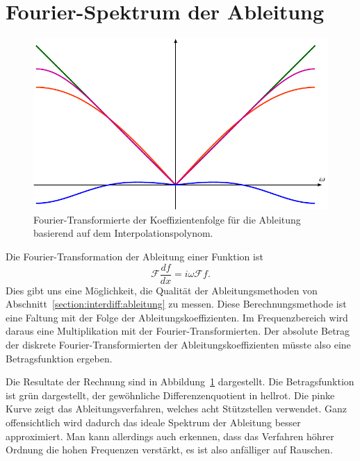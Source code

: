 %
%
%
\section{Fourier-Spektrum der Ableitung}
\begin{figure}
\centering
\includegraphics{papers/interdiff/experiment.pdf}
\caption{Fourier-Transformierte der Koeffizientenfolge für die Ableitung 
basierend auf dem Interpolationspolynom.
\label{interdiff:spektrum}}
\end{figure}
Die Fourier-Transformation der Ableitung einer Funktion ist
\[
\mathcal{F}
\frac{df}{dx}
=
i\omega\mathcal{F}f.
\]
Dies gibt uns eine Möglichkeit, die Qualität der Ableitungsmethoden
von Abschnitt~\ref{section:interdiff:ableitung} zu messen.
Diese Berechnungsmethode ist eine Faltung mit der Folge der
Ableitungskoeffizienten.
Im Frequenzbereich wird daraus eine Multiplikation mit der
Fourier-Transformierten.
Der absolute Betrag der diskrete Fourier-Transformierten
der Ableitungskoeffizienten müsste also eine Betragsfunktion ergeben.

Die Resultate der Rechnung sind in Abbildung~\ref{interdiff:spektrum}
dargestellt.
Die Betragsfunktion ist grün dargestellt,
der gewöhnliche Differenzenquotient in hellrot.
Die pinke Kurve zeigt das Ableitungsverfahren, welches acht
Stützstellen verwendet.
Ganz offensichtlich wird dadurch das ideale Spektrum der
Ableitung besser approximiert.
Man kann allerdings auch erkennen, dass das Verfahren höhrer Ordnung
die hohen Frequenzen verstärkt, es ist also anfälliger auf Rauschen.



